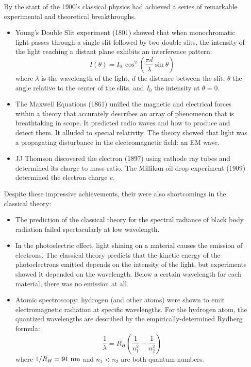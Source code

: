 \documentclass[12pt]{book}
\begin{document}
By the start of the 1900's classical physics had achieved a series of remarkable experimental and theoretical breakthroughs.
\begin{itemize}

\item Young's Double Slit experiment (1801) showed that when monochromatic light passes through a single slit followed by two double slits, the intensity of the light reaching a distant plane exhibits an interference pattern:
\begin{displaymath}
I(\theta) = I_0 \, \cos^2\left(\frac{\pi d}{\lambda} \sin \theta \right)
\end{displaymath}
where $\lambda$ is the wavelength of the light, $d$ the distance between the slit, $\theta$ the angle relative to the center of the slits, and $I_0$ the intensity at $\theta=0$.  

\item The Maxwell Equations (1861) unified the magnetic and electrical forces within a theory that accurately describes an array of phenomenon that is breathtaking in scope.  It predicted radio waves and how to produce and detect them.  It alluded to special relativity.  The theory showed that light was a propagating disturbance in the electromagnetic field: an EM wave.
\item JJ Thomson discovered the electron (1897) using cathode ray tubes and determined its charge to mass ratio.  The Millikan oil drop experiment (1909) determined the electron charge $e$.
\end{itemize}
Despite these impressive achievements, their were also shortcomings in the classical theory:
\begin{itemize}
\item The prediction of the classical theory for the spectral radiance of black body radiation failed spectacularly at low wavelength.
\item In the photoelectric effect, light shining on a material causes the emission of electrons.  The classical theory predicts that the kinetic energy of the photoelectrons emitted depends on the intensity of the light, but experiments showed it depended on the wavelength.  Below a certain wavelength for each material, there was no emission at all.
\item Atomic spectroscopy: hydrogen (and other atoms) were shown to emit electromagnetic radiation at specific wavelengths.  For the hydrogen atom, the quantized wavelengths are described by the empirically-determined Rydberg formula:
\begin{displaymath}
\frac{1}{\lambda} = R_H \left( \frac{1}{n_1^2} - \frac{1}{n_2^2} \right)
\end{displaymath}
where $1/R_H = 91~\rm nm$ and $n_1 < n_2$ are both quantum numbers.
\end{itemize}
\end{document}
